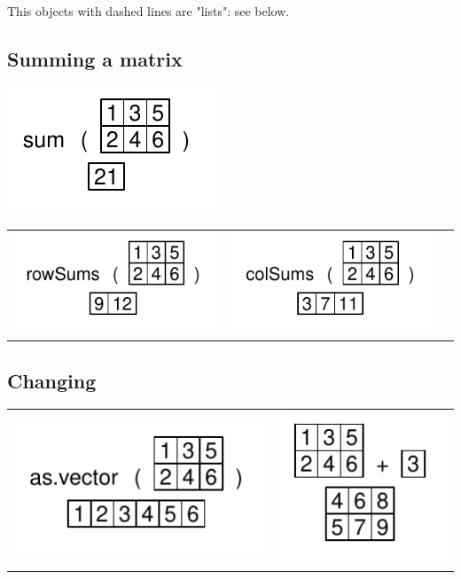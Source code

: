 \documentclass[pdflatex]{article}
\begin{document}
This objects with dashed lines are "lists": see below.

\subsection{Summing a matrix}

\includegraphics{matrix_sum} 

\begin{tabular}{ccc}
\includegraphics{rowSums} & \includegraphics{colSums}
\end{tabular}

\subsection{Changing}

\begin{tabular}{cc}
\includegraphics{as_vector} & \includegraphics{matrix_operator}\\
\end{tabular}
\end{document}
